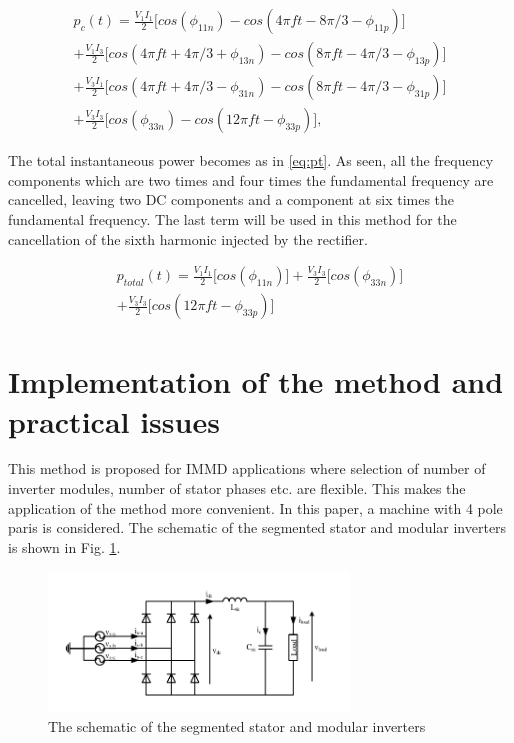 \documentclass[conference,a4paper,twocolumn]{IEEEtran}
\begin{document}
\begin{equation}
\label{eq:pc}
\begin{multlined}
p_c(t) = 
\frac{V_1I_1}{2} \bigg \lbrack cos(\phi_{11n})-cos(4\pi ft-8\pi/3-\phi_{11p}) \bigg \rbrack
\\
+
\frac{V_1I_3}{2} \bigg \lbrack cos(4\pi ft+ 4\pi/3+\phi_{13n})-cos(8\pi ft-4\pi/3-\phi_{13p}) \bigg \rbrack
\\
+
\frac{V_3I_1}{2} \bigg \lbrack cos(4\pi ft+4\pi/3-\phi_{31n})-cos(8\pi ft-4\pi/3-\phi_{31p}) \bigg \rbrack
\\
+
\frac{V_3I_3}{2} \bigg \lbrack cos(\phi_{33n})-cos(12\pi ft-\phi_{33p}) \bigg \rbrack,
\end{multlined}
\end{equation}

The total instantaneous power becomes as in \ref{eq:pt}. As seen, all the frequency components which are two times and four times the fundamental frequency are cancelled, leaving two DC components and a component at six times the fundamental frequency. The last term will be used in this method for the cancellation of the sixth harmonic injected by the rectifier.

\begin{equation}
\label{eq:pt}
\begin{multlined}
p_{total}(t) = 
\frac{V_1I_1}{2} \bigg \lbrack cos(\phi_{11n}) \bigg \rbrack
+
\frac{V_3I_3}{2} \bigg \lbrack cos(\phi_{33n}) \bigg \rbrack
\\
+
\frac{V_3I_3}{2} \bigg \lbrack cos(12\pi ft-\phi_{33p}) \bigg \rbrack
\end{multlined}
\end{equation}

\section{Implementation of the method and practical issues}

This method is proposed for IMMD applications where selection of number of inverter modules, number of stator phases etc. are flexible. This makes the application of the method more convenient. In this paper, a machine with 4 pole paris is considered. The schematic of the segmented stator and modular inverters is shown in Fig. \ref{fig:segmented}. 

\begin{figure}[htp]
  \centering
  \includegraphics[width=8cm]{images/rect_circuit}
  \caption{The schematic of the segmented stator and modular inverters}
  \label{fig:segmented}
\end{figure}
\end{document}
